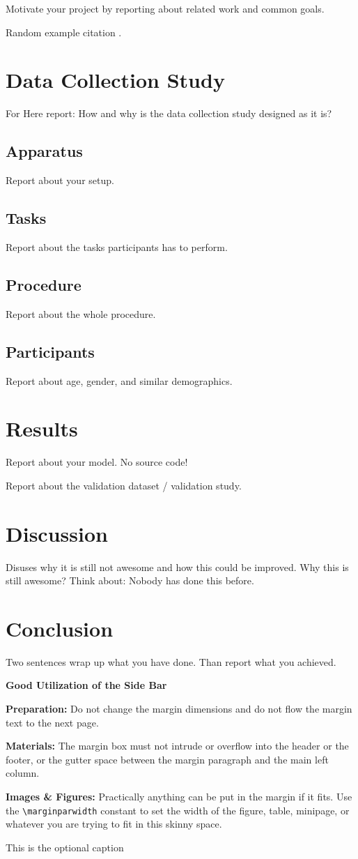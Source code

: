 \documentclass[sigchi-a, authorversion]{acmart}
\begin{document}
Motivate your project by reporting about related work and common goals.

Random example citation \cite{Le:2018:PalmTouch}.

\section{Data Collection Study}
For 
Here report: How and why is the data collection study designed as it is?
\subsection{Apparatus}
Report about your setup.
\subsection{Tasks}
Report about the tasks participants has to perform.
\subsection{Procedure}
Report about the whole procedure.
\subsection{Participants}
Report about age, gender, and similar demographics.
\section{Results}
Report about your model. No source code!

Report about the validation dataset / validation study. 
\section{Discussion}
Disuses why it is still not awesome and how this could be improved. Why this is still awesome? Think about: Nobody has done this before. 
\section{Conclusion}
Two sentences wrap up what you have done. Than report what you achieved. 


\begin{sidebar}
  \textbf{Good Utilization of the Side Bar}

  \textbf{Preparation:} Do not change the margin
  dimensions and do not flow the margin text to the
  next page.

  \textbf{Materials:} The margin box must not intrude
  or overflow into the header or the footer, or the gutter space
  between the margin paragraph and the main left column.

  \textbf{Images \& Figures:} Practically anything
  can be put in the margin if it fits. Use the
  \texttt{{\textbackslash}marginparwidth} constant to set the
  width of the figure, table, minipage, or whatever you are trying
  to fit in this skinny space.

  \caption{This is the optional caption}
  \label{bar:sidebar}
\end{sidebar}
\end{document}
